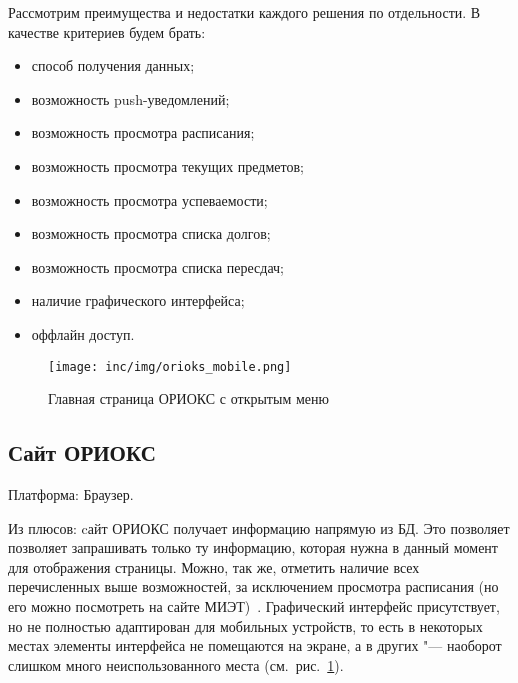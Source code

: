 Рассмотрим преимущества и недостатки каждого решения по отдельности.
В качестве критериев будем брать:
\begin{itemize}
  \item способ получения данных;
  \item возможность push-уведомлений;
  \item возможность просмотра расписания;
  \item возможность просмотра текущих предметов;
  \item возможность просмотра успеваемости;
  \item возможность просмотра списка долгов;
  \item возможность просмотра списка пересдач;
  \item наличие графического интерфейса;
  \item оффлайн доступ.
\end{itemize}

\begin{figure}[ht]
  \centering
  \texttt{[image: inc/img/orioks\_mobile.png]}
  \caption{Главная страница ОРИОКС с открытым меню}
  \label{fig:orioksMobile}
\end{figure}

\subsection{Сайт ОРИОКС}
\label{subsec:orioks}

Платформа: Браузер.

Из плюсов: cайт ОРИОКС получает информацию напрямую из БД.
Это позволяет позволяет запрашивать только ту информацию, которая нужна в данный момент для отображения страницы.
Можно, так же, отметить наличие всех перечисленных выше возможностей, за исключением просмотра расписания (но его можно посмотреть на сайте МИЭТ)~\cite{orioks}.
Графический интерфейс присутствует, но не полностью адаптирован для мобильных устройств, то есть в некоторых местах элементы интерфейса не помещаются на экране, а в других "--- наоборот слишком много неиспользованного места (см.~рис.~\ref{fig:orioksMobile}).

